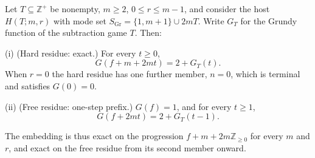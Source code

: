 \begin{theorem}\label{thm:embed-grundy}
Let $T \subseteq \mathbb{Z}^+$ be nonempty, $m \ge 2$,
$0 \le r \le m-1$, and consider the host $H(T; m, r)$ with mode set
$S_{\mathrm{Gr}} = \{1, m+1\} \cup 2mT$. Write $G_T$ for the Grundy
function of the subtraction game $T$. Then:

(i) (Hard residue: exact.) For every $t \ge 0$,
\[ G(f + m + 2mt) = 2 + G_T(t). \]
When $r = 0$ the hard residue has one further member, $n = 0$, which is
terminal and satisfies $G(0) = 0$.

(ii) (Free residue: one-step prefix.) $G(f) = 1$, and for every
$t \ge 1$,
\[ G(f + 2mt) = 2 + G_T(t - 1). \]

The embedding is thus exact on the progression
$f + m + 2m\mathbb{Z}_{\ge 0}$ for every $m$ and $r$, and exact on the
free residue from its second member onward.
\end{theorem}
